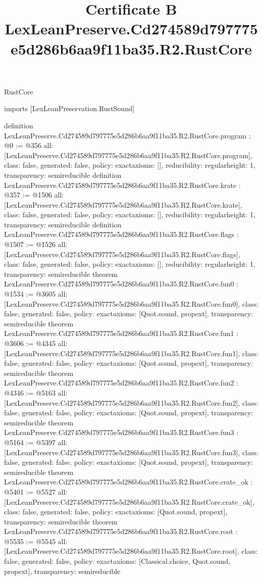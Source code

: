 \begin{lexlean}{RustCore}
\title{Certificate B LexLeanPreserve.Cd274589d797775e5d286b6aa9f11ba35.R2.RustCore}
\begin{coremodule}
imports [LexLeanPreservation.RustSound]

definition LexLeanPreserve.Cd274589d797775e5d286b6aa9f11ba35.R2.RustCore.program : @0 := @356 {
  all: [LexLeanPreserve.Cd274589d797775e5d286b6aa9f11ba35.R2.RustCore.program],
  class: false,
  generated: false,
  policy: exact{axioms: []},
  reducibility: regular{height: 1},
  transparency: semireducible
}
definition LexLeanPreserve.Cd274589d797775e5d286b6aa9f11ba35.R2.RustCore.krate : @357 := @1506 {
  all: [LexLeanPreserve.Cd274589d797775e5d286b6aa9f11ba35.R2.RustCore.krate],
  class: false,
  generated: false,
  policy: exact{axioms: []},
  reducibility: regular{height: 1},
  transparency: semireducible
}
definition LexLeanPreserve.Cd274589d797775e5d286b6aa9f11ba35.R2.RustCore.flags : @1507 := @1526 {
  all: [LexLeanPreserve.Cd274589d797775e5d286b6aa9f11ba35.R2.RustCore.flags],
  class: false,
  generated: false,
  policy: exact{axioms: []},
  reducibility: regular{height: 1},
  transparency: semireducible
}
theorem LexLeanPreserve.Cd274589d797775e5d286b6aa9f11ba35.R2.RustCore.fun0 : @1534 := @3605 {
  all: [LexLeanPreserve.Cd274589d797775e5d286b6aa9f11ba35.R2.RustCore.fun0],
  class: false,
  generated: false,
  policy: exact{axioms: [Quot.sound, propext]},
  transparency: semireducible
}
theorem LexLeanPreserve.Cd274589d797775e5d286b6aa9f11ba35.R2.RustCore.fun1 : @3606 := @4345 {
  all: [LexLeanPreserve.Cd274589d797775e5d286b6aa9f11ba35.R2.RustCore.fun1],
  class: false,
  generated: false,
  policy: exact{axioms: [Quot.sound, propext]},
  transparency: semireducible
}
theorem LexLeanPreserve.Cd274589d797775e5d286b6aa9f11ba35.R2.RustCore.fun2 : @4346 := @5163 {
  all: [LexLeanPreserve.Cd274589d797775e5d286b6aa9f11ba35.R2.RustCore.fun2],
  class: false,
  generated: false,
  policy: exact{axioms: [Quot.sound, propext]},
  transparency: semireducible
}
theorem LexLeanPreserve.Cd274589d797775e5d286b6aa9f11ba35.R2.RustCore.fun3 : @5164 := @5397 {
  all: [LexLeanPreserve.Cd274589d797775e5d286b6aa9f11ba35.R2.RustCore.fun3],
  class: false,
  generated: false,
  policy: exact{axioms: [Quot.sound, propext]},
  transparency: semireducible
}
theorem LexLeanPreserve.Cd274589d797775e5d286b6aa9f11ba35.R2.RustCore.crate_ok : @5401 := @5527 {
  all: [LexLeanPreserve.Cd274589d797775e5d286b6aa9f11ba35.R2.RustCore.crate_ok],
  class: false,
  generated: false,
  policy: exact{axioms: [Quot.sound, propext]},
  transparency: semireducible
}
theorem LexLeanPreserve.Cd274589d797775e5d286b6aa9f11ba35.R2.RustCore.root : @5535 := @5545 {
  all: [LexLeanPreserve.Cd274589d797775e5d286b6aa9f11ba35.R2.RustCore.root],
  class: false,
  generated: false,
  policy: exact{axioms: [Classical.choice, Quot.sound, propext]},
  transparency: semireducible
}


\end{coremodule}
\end{lexlean}
